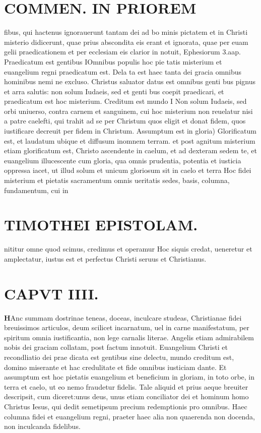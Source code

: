 \documentclass{article}
\begin{document}
\begin{pages}
\section*{COMMEN. IN PRIOREM }
\marginpar{[ p.92 ]}\pstart fibus, qui hactenus ignorauerunt tantam dei ad bo minis pictatem et in Christi misterio didicerunt, quae prius abscondita eis erant et ignorata, quae per euam gelii praedicationem et per ecclesiam eis clarior in notuit, Ephesiorum 3.aap.  \pend\pstart Praedicatum est gentibus IOmnibus populis hoc pie tatis misterium et euangelium regni praedicatum est. Dela ta est haec tanta dei gracia omnibus hominibus nemi ne excluso. Christus saluator datus est omnibus genti bus pignus et arra salutis: non solum Iudaeis, sed et genti bus coepit praedicari, et praedicatum est hoc misterium.  \pend\pstart Creditum est mundo I Non solum Iudaeis, sed orbi uniuerso, contra carnem et sanguinem, cui hoc misterium non reuelatur nisi a patre caelefti, qui trahit ad se per Christum quos eligit et donat fidem, quos iustificare decreuit per fidem in Christum.  \pend\pstart Assumptum est in gloria) Glorificatum est, et laudatum ubique et diffusum inomnem terram. et post agnitum misterium etiam glorificatum est, Christo ascendente in caelum, et ad dexteram sedem te, et euangelium illucescente cum gloria, qua omnis prudentia, potentia et iusticia oppressa iacet, ut illud solum et unicum gloriosum sit in caelo et terra Hoc fidei misterium et pietatis sacramentum omnis ueritatis sedes, basis, columna, fundamentum, cui in\pend
\section*{TIMOTHEI EPISTOLAM. }
\marginpar{[ p.93 ]}\pstart nititur omne quod scimus, credimus et operamur Hoc siquis credat, ueneretur et amplectatur, iustus est et perfectus Christi seruus et Christianus.  \pend
\endnumbering\beginnumbering\section{CAPVT IIII.}\pstart \huge\textbf{H}\normalsize Anc summam dostrinae teneas, doceas, inculcare studeas, Christianae fidei breuissimos articulos, deum scilicet incarnatum, uel in carne manifestatum, per spiritum omnia iustificantia, non lege carnalis literae. Angelis etiam admirabilem nobis dei graciam collatam, post factum innotuit. Euangelium Christi et recondliatio dei prae dicata est gentibus sine delectu, mundo creditum est, domino miserante et hac credulitate et fide omnibus iusticiam dante. Et assumptum est hoc pietatis euangelium et beneficium in gloriam, in toto orbe, in terra et caelo, ut eo nemo fraudetur fidelis. Tale aliquid et prius aeque breuiter descripsit, cum diceret:unus deus, unus etiam conciliator dei et hominum homo Christus Iesus, qui dedit semetipsum precium redemptionis pro omnibus. Haec columna fidei et euangelium regni, praeter haec alia non quaerenda non docenda, non inculcanda fidelibus.  \pend
{}
{}

\end{pages}
\end{document}
